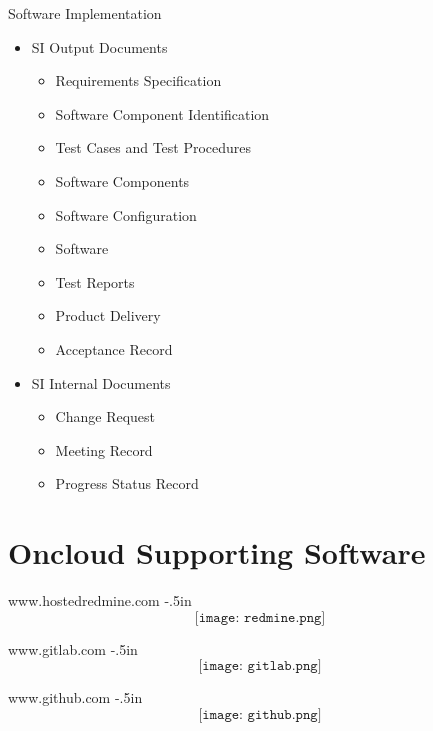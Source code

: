 \begin{frame}{Software Implementation}
\begin{itemize}
\item SI Output Documents
\begin{itemize}
\item Requirements Specification
\item Software Component Identification
\item Test Cases and Test Procedures
\item Software Components
\item Software Configuration
\item Software
\item Test Reports
\item Product Delivery
\item Acceptance Record
\end{itemize}
\item SI Internal Documents
\begin{itemize}
\item Change Request
\item Meeting Record
\item Progress Status Record
\end{itemize}
\end{itemize}
\end{frame}

\section{Oncloud Supporting Software}
\begin{frame}{www.hostedredmine.com}
\null
\kern -.5in
$$\texttt{[image: redmine.png]}$$
\end{frame}

\begin{frame}{www.gitlab.com}
\null
\kern -.5in
$$\texttt{[image: gitlab.png]}$$
\end{frame}

\begin{frame}{www.github.com}
\null
\kern -.5in
$$\texttt{[image: github.png]}$$
\end{frame}
\endinput
